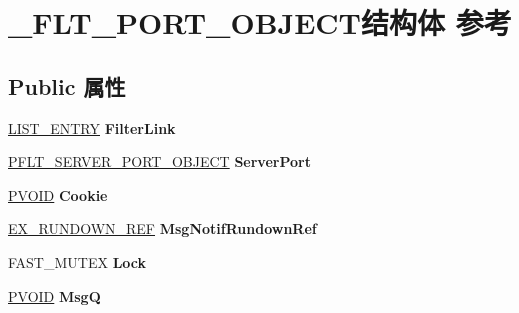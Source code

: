 \hypertarget{struct___f_l_t___p_o_r_t___o_b_j_e_c_t}{}\section{\+\_\+\+F\+L\+T\+\_\+\+P\+O\+R\+T\+\_\+\+O\+B\+J\+E\+C\+T结构体 参考}
\label{struct___f_l_t___p_o_r_t___o_b_j_e_c_t}
\subsection*{Public 属性}
\begin{DoxyCompactItemize}
\item 
\mbox{\label{struct___f_l_t___p_o_r_t___o_b_j_e_c_t_ad35655d5191cf110fa75c260029f2722}} 
\hyperlink{struct___l_i_s_t___e_n_t_r_y}{L\+I\+S\+T\+\_\+\+E\+N\+T\+RY} {\bfseries Filter\+Link}
\item 
\mbox{\label{struct___f_l_t___p_o_r_t___o_b_j_e_c_t_a9b965967fde92a563898208d8d624ac5}} 
\hyperlink{struct___f_l_t___s_e_r_v_e_r___p_o_r_t___o_b_j_e_c_t}{P\+F\+L\+T\+\_\+\+S\+E\+R\+V\+E\+R\+\_\+\+P\+O\+R\+T\+\_\+\+O\+B\+J\+E\+CT} {\bfseries Server\+Port}
\item 
\mbox{\label{struct___f_l_t___p_o_r_t___o_b_j_e_c_t_ac1ae9d64553e4337709ce20303f50f65}} 
\hyperlink{interfacevoid}{P\+V\+O\+ID} {\bfseries Cookie}
\item 
\mbox{\label{struct___f_l_t___p_o_r_t___o_b_j_e_c_t_a8f83934396176916a9f0186c35affc7e}} 
\hyperlink{struct___e_x___r_u_n_d_o_w_n___r_e_f}{E\+X\+\_\+\+R\+U\+N\+D\+O\+W\+N\+\_\+\+R\+EF} {\bfseries Msg\+Notif\+Rundown\+Ref}
\item 
\mbox{\label{struct___f_l_t___p_o_r_t___o_b_j_e_c_t_af2e56b8c3492a4df6cf15e2f19894d55}} 
F\+A\+S\+T\+\_\+\+M\+U\+T\+EX {\bfseries Lock}
\item 
\mbox{\label{struct___f_l_t___p_o_r_t___o_b_j_e_c_t_a8634dceb0b52a122286f60868a329588}} 
\hyperlink{interfacevoid}{P\+V\+O\+ID} {\bfseries MsgQ}

\end{DoxyCompactItemize}
